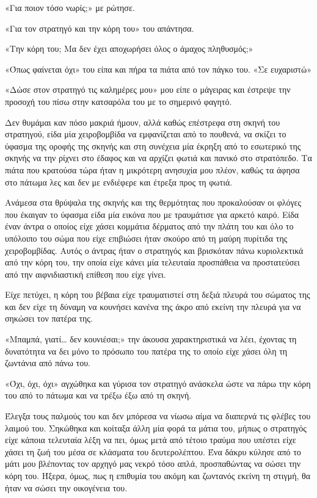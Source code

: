 \documentclass[12pt,twoside, openany]{book}
\begin{document}
«Για ποιον τόσο νωρίς;» με ρώτησε.

«Για τον στρατηγό και την κόρη του» του απάντησα.

«Την κόρη του; Μα δεν έχει αποχωρήσει όλος ο άμαχος πληθυσμός;»

«Όπως φαίνεται όχι» του είπα και πήρα τα πιάτα από τον πάγκο του. «Σε ευχαριστώ»

«Δώσε στον στρατηγό τις καλημέρες μου» μου είπε ο μάγειρας και έστρεψε την προσοχή του πίσω στην κατσαρόλα του με το σημερινό φαγητό.

Δεν θυμάμαι καν πόσο μακριά ήμουν, αλλά καθώς επέστρεφα στη σκηνή του στρατηγού, είδα μία χειροβομβίδα να εμφανίζεται από το πουθενά, να σκίζει το ύφασμα της οροφής της σκηνής και στη συνέχεια μία έκρηξη από το εσωτερικό της σκηνής να την ρίχνει στο έδαφος και να αρχίζει φωτιά και πανικό στο στρατόπεδο. Τα πιάτα που κρατούσα τώρα ήταν η μικρότερη ανησυχία μου πλέον, καθώς τα άφησα στο πάτωμα λες και δεν με ενδιέφερε και έτρεξα προς τη φωτιά. 

Ανάμεσα στα θρύψαλα της σκηνής και της θερμότητας που προκαλούσαν οι φλόγες που έκαιγαν το ύφασμα είδα μία εικόνα που με τραυμάτισε για αρκετό καιρό. Είδα έναν άντρα ο οποίος είχε χάσει κομμάτια δέρματος από την πλάτη του και όλο το υπόλοιπο του σώμα που είχε επιβιώσει ήταν σκούρο από τη μαύρη πυρίτιδα της χειροβομβίδας. Αυτός ο άντρας ήταν ο στρατηγός και βρισκόταν πάνω κυριολεκτικά από την κόρη του, την οποία είχε κάνει μία τελευταία προσπάθεια να προστατεύσει από την αιφνιδιαστική επίθεση που είχε γίνει. 

Είχε πετύχει, η κόρη του βέβαια είχε τραυματιστεί στη δεξιά πλευρά του σώματος της και δεν είχε τη δύναμη να κουνήσει κανένα της άκρο από εκείνη την πλευρά για να σηκώσει τον πατέρα της.

«Μπαμπά, γιατί… δεν κουνιέσαι;» την άκουσα χαρακτηριστικά να λέει, έχοντας τη δυνατότητα να δει μόνο το πρόσωπο του πατέρα της το οποίο είχε χάσει όλη τη ζωντάνια από πάνω του.

«Όχι, όχι, όχι» αγχώθηκα και γύρισα τον στρατηγό ανάσκελα ώστε να πάρω την κόρη του από το πάτωμα και να τρέξω έξω από τη σκηνή. 

Έλεγξα τους παλμούς του και δεν μπόρεσα να νίωσω αίμα να διαπερνά τις φλέβες του λαιμού του. Σηκώθηκα και κοίταξα άλλη μία φορά τα μάτια του, μήπως ο στρατηγός είχε κάποια τελευταία λέξη να πει, όμως μετά από τέτοιο τραύμα που υπέστει είχε χάσει τη ζωή του μέσα σε κλάσματα του δευτερολέπτου. Ένα δάκρυ κύλησε από το μάτι μου βλέποντας τον αρχηγό μας νεκρό τόσο απλά, προσπαθώντας να σώσει την κόρη του. Ήξερα, όμως, πως η επιθυμία του ακόμη και ζωντανός εκείνη τη στιγμή, θα ήταν να σώσει την οικογένεια του.
\end{document}
